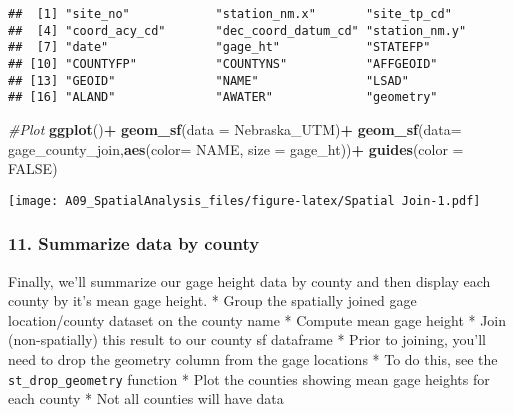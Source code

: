 \documentclass[]{article}
\newenvironment{Shaded}{\begin{snugshade}}{\end{snugshade}}
\newcommand{\KeywordTok}[1]{\textcolor[rgb]{0.13,0.29,0.53}{\textbf{#1}}}
\newcommand{\DataTypeTok}[1]{\textcolor[rgb]{0.13,0.29,0.53}{#1}}
\newcommand{\StringTok}[1]{\textcolor[rgb]{0.31,0.60,0.02}{#1}}
\newcommand{\CommentTok}[1]{\textcolor[rgb]{0.56,0.35,0.01}{\textit{#1}}}
\newcommand{\OtherTok}[1]{\textcolor[rgb]{0.56,0.35,0.01}{#1}}
\newcommand{\OperatorTok}[1]{\textcolor[rgb]{0.81,0.36,0.00}{\textbf{#1}}}
\newcommand{\NormalTok}[1]{#1}
\begin{document}
\begin{verbatim}
##  [1] "site_no"            "station_nm.x"       "site_tp_cd"        
##  [4] "coord_acy_cd"       "dec_coord_datum_cd" "station_nm.y"      
##  [7] "date"               "gage_ht"            "STATEFP"           
## [10] "COUNTYFP"           "COUNTYNS"           "AFFGEOID"          
## [13] "GEOID"              "NAME"               "LSAD"              
## [16] "ALAND"              "AWATER"             "geometry"
\end{verbatim}

\begin{Shaded}
\begin{Highlighting}[]
\CommentTok{#Plot}
\KeywordTok{ggplot}\NormalTok{()}\OperatorTok{+}
\StringTok{  }\KeywordTok{geom_sf}\NormalTok{(}\DataTypeTok{data =}\NormalTok{ Nebraska_UTM)}\OperatorTok{+}
\StringTok{  }\KeywordTok{geom_sf}\NormalTok{(}\DataTypeTok{data=}\NormalTok{ gage_county_join,}\KeywordTok{aes}\NormalTok{(}\DataTypeTok{color=}\NormalTok{ NAME, }\DataTypeTok{size =}\NormalTok{ gage_ht))}\OperatorTok{+}
\StringTok{  }\KeywordTok{guides}\NormalTok{(}\DataTypeTok{color =} \OtherTok{FALSE}\NormalTok{)}
\end{Highlighting}
\end{Shaded}

\texttt{[image: A09\_SpatialAnalysis\_files/figure-latex/Spatial Join-1.pdf]}

\subsubsection{11. Summarize data by
county}\label{summarize-data-by-county}

Finally, we'll summarize our gage height data by county and then display
each county by it's mean gage height. * Group the spatially joined gage
location/county dataset on the county name * Compute mean gage height *
Join (non-spatially) this result to our county sf dataframe * Prior to
joining, you'll need to drop the geometry column from the gage locations
* To do this, see the \texttt{st\_drop\_geometry} function * Plot the
counties showing mean gage heights for each county * Not all counties
will have data

\begin{Shaded}
\end{Shaded}
\end{document}
